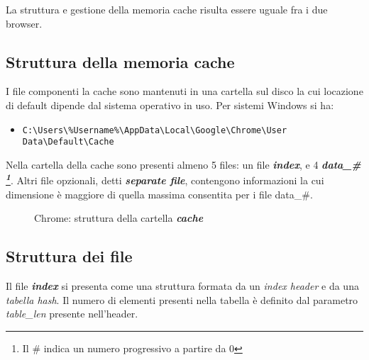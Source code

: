 La struttura e gestione della memoria cache risulta essere uguale fra i due browser.

\subsection{Struttura della memoria cache}

I file componenti la cache sono mantenuti in una cartella sul disco la cui locazione di default dipende dal sistema operativo in uso. Per sistemi Windows si ha: 

\begin{itemize}
	\item{\texttt{C:\textbackslash Users\textbackslash\%Username\%\textbackslash AppData\textbackslash Local\textbackslash Google\textbackslash Chrome\textbackslash User Data\textbackslash Default\textbackslash Cache}}
\end{itemize}

Nella cartella della cache sono presenti almeno 5 files: un file \textbf{\textit{index}}, e 4 \textbf{\textit{data\_\# \footnote{Il \# indica un numero progressivo a partire da 0}}}. Altri file opzionali, detti \textbf{\textit{separate file}}, contengono informazioni la cui dimensione è maggiore di quella massima consentita per i file data\_\#.

\begin{figure}[h]
	\centering
	\begin{minipage}[c]{0.7\textwidth}
	\end{minipage}
	\caption{Chrome: struttura della cartella \textbf{\textit{cache}}}
\end{figure}

\subsection{Struttura dei file}
Il file \textbf{\textit{index}} si presenta come una struttura formata da un \textit{index header} e da una \textit{tabella hash}. Il numero di elementi presenti nella tabella è definito dal parametro \textit{table\_len} presente nell'header. 

